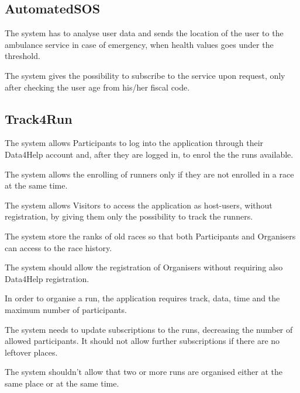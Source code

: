 \subsection{AutomatedSOS}

\begin{enumerate}[label={[}R2.\arabic*{]}]

    \item The system has to analyse user data and sends the location of the user to the ambulance service in case of emergency, when health values goes under the threshold.
    
    \item The system gives the possibility to subscribe to the service upon request, only after checking the user age from his/her fiscal code.
\end{enumerate}


\subsection{Track4Run}

\begin{enumerate}[label={[}R3.\arabic*{]}]

    \item The system allows Participants to log into the application through their Data4Help account and, after they are logged in, to enrol the the runs available.
    
    \item The system allows the enrolling of runners only if they are not enrolled in a race at the same time.
    
    \item The system allows Visitors to access the application as host-users, without registration, by giving them only the possibility to track the runners.
    
    \item The system store the ranks of old races so that both Participants and Organisers can access to the race history.
    
    \item The system should allow the registration of Organisers without requiring also Data4Help registration.
    
    \item In order to organise a run, the application requires track, data, time and the maximum number of participants.
    
    \item The system needs to update subscriptions to the runs, decreasing the number of allowed participants. It should not allow further subscriptions if there are no leftover places.
    
    \item The system shouldn't allow that two or more runs are organised either at the same place or at the same time.

\end{enumerate}